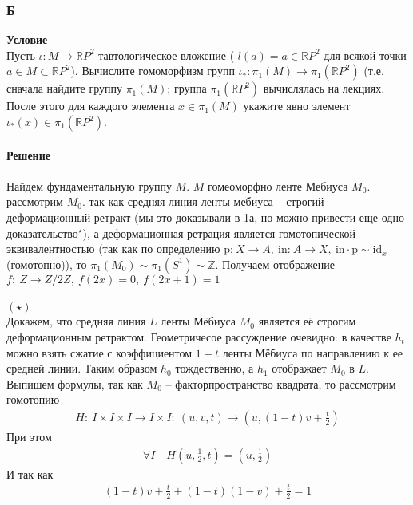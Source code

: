 			\subsubsection*{\textbf{Б}}
			\textbf{Условие}\\
			Пусть $\iota: M \rightarrow \mathbb{R} P^{2}$ тавтологическое вложение ( $l(a)=a \in \mathbb{R} P^2$ для всякой точки $a \in M \subset \mathbb{R} P^{2}$). Вычислите гомоморфизм групп $\iota_{*}: \pi_{1}(M) \rightarrow \pi_{1}\left(\mathbb{R} P^{2}\right)$ (т.е. сначала найдите группу $\pi_1(M)$; группа $\pi_1(\mathbb{R}P^2)$ вычислялась на лекциях. После этого для каждого элемента $x \in \pi_{1}(M)$ укажите явно элемент $\iota_{*}(x) \in \pi_{1}\left(\mathbb{R} P^{2}\right)$.\\
			\\
			\textbf{Решение}\\
			\\
			Найдем фундаментальную группу $M$. $M$ гомеоморфно ленте Мебиуса $M_0$.\\			
			рассмотрим $M_0$. так как средняя линия ленты мебиуса -- строгий деформационный ретракт (мы это доказывали в 1а, но можно привести еще одно доказательство$^{\star}$), а деформационная ретрация является гомотопической эквивалентностью (так как по определению $\text{p:}\: X \to A,\ \text{in:}\: A \to X,\ \text{in} \cdot \text{p} \sim \text{id}_x$ (гомотопно)), то $	\pi_1(M_0) \sim \pi_1(S^1) \sim \mathbb{Z}$. Получаем отображение $f:\ Z \to Z/2Z,\ f(2x)=0,\ f(2x+1)=1$\\
			\\ 
			$(\star)$\\
			Докажем, что средняя линия $L$ ленты Мёбиуса $M_0$ является её строгим деформационным ретрактом. Геометричесое рассуждение очевидно: в качестве $h_t$ можно взять сжатие с коэффициентом $1-t$ ленты Мёбиуса по направлению к ее средней линии. Таким образом $h_0$ тождественно, а $h_1$ отображает $M_0$ в $L$. Выпишем формулы, так как $M_0$ -- факторпространство квадрата, то рассмотрим гомотопию
			\begin{gather*}
				H:\ I \times I \times I \to I \times I:\ (u,v,t) \to (u, (1-t)v + \frac{t}{2})
			\end{gather*}
			При этом 
			\begin{gather*}
				\forall I\quad H(u, \frac{1}{2}, t) = (u, \frac{1}{2})
			\end{gather*}
			И так как
			\begin{gather*}
				(1-t)v + \frac{t}{2} + (1-t)(1-v) + \frac{t}{2} = 1
			\end{gather*}
